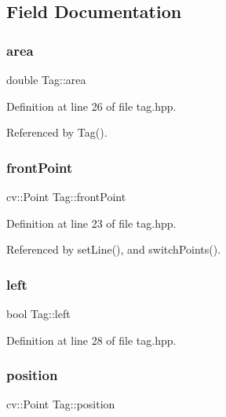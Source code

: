 \subsection{Field Documentation}
\mbox{\label{class_tag_a0e977e5b9c03ed1280eb9aeedd3c9dbc}} 
\subsubsection{\texorpdfstring{area}{area}}
{\footnotesize\ttfamily double Tag\+::area}



Definition at line 26 of file tag.\+hpp.



Referenced by Tag().

\mbox{\label{class_tag_a7c2bc76740b514cbc77487468535c670}} 
\subsubsection{\texorpdfstring{front\+Point}{frontPoint}}
{\footnotesize\ttfamily cv\+::\+Point Tag\+::front\+Point}



Definition at line 23 of file tag.\+hpp.



Referenced by set\+Line(), and switch\+Points().

\mbox{\label{class_tag_a867bd4f49f47b0650834af1eb22671d9}} 
\subsubsection{\texorpdfstring{left}{left}}
{\footnotesize\ttfamily bool Tag\+::left}



Definition at line 28 of file tag.\+hpp.

\mbox{\label{class_tag_a254916f52244a8ff7d559eff681450a1}} 
\subsubsection{\texorpdfstring{position}{position}}
{\footnotesize\ttfamily cv\+::\+Point Tag\+::position}



